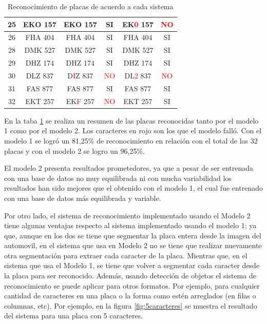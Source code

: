 {\begin{table}[H]
\begin{center}
{\begin{tabular}{||c|c||c|c||c|c||}
         25 & EKO 157 & EKO 157 & SI & EK\textcolor{red}{0} 157 & \textcolor{red}{NO} \\ \hline
         26 & FHA 404 &  FHA 404 & SI &  FHA 404 & SI \\ \hline
         28 & DMK 527 & DMK 527 & SI & DMK 527 & SI \\ \hline
         29 & DHZ 174 & DHZ 174 & SI & DHZ 174 & SI \\ \hline
         30 & DLZ 837 & D\textcolor{red}{I}Z 837 &  \textcolor{red}{NO} & DL\textcolor{red}{2} 837 & \textcolor{red}{NO} \\ \hline
         31 & FAS 877 & FAS 877 & SI & FAS 877 & SI \\ \hline
         32 & EKT 257 & EK\textcolor{red}{F} 257 & \textcolor{red}{NO} & EKT 257 & SI \\ \hline \hline 
    \end{tabular}
    }
    \end{center}
    \caption{Reconocimiento de placas de acuerdo a cada sistema}
    \label{tab:comparacion}
\end{table}}

En la taba \ref{tab:comparacion} se realiza un resumen de las placas reconocidas tanto por el modelo 1 como por el modelo 2. Los caracteres en rojo son los que el modelo falló. Con el modelo 1 se logró un 81,25\% de reconocimiento en relación con el total de las 32 placas y con el modelo 2 se logro un 96,25\%.

El modelo 2 presenta resultados prometedores, ya que a pesar de ser entrenada con una base de datos no muy equilibrada ni con mucha variabilidad los resultados han sido mejores que el obtenido con el modelo 1, el cual fue entrenado con una base de datos más equilibrada y variable.

Por otro lado, el sistema de reconocimiento implementado usando el Modelo 2 tiene algunas ventajas respecto al sistema implementado usando el modelo 1; ya que, aunque en los dos se tiene que segmentar la placa entera desde la imagen del automovil, en el sistema que usa en Modelo 2 no se tiene que realizar nuevamente otra segmentación para extraer cada caracter de la placa. Mientras que, en el sistema que usa el Modelo 1, se tiene que volver a segmentar cada caracter desde la placa para ser reconocido. Además, usando detección de objetos el sistema de reconocimiento se puede aplicar para otros formatos. Por ejemplo, para cualquier cantidad de caracteres en una placa o la forma como estén arreglados (en filas o columnas, etc). Por ejemplo, en la figura \ref{fig:5caracteres} se muestra el resultado del sistema para una placa con 5 caracteres. 

